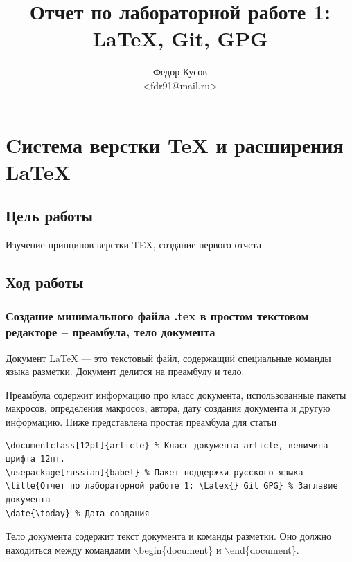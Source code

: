 \documentclass[12pt,a4paper]{article}
\author{Федор Кусов\\<fdr91@mail.ru>}
\title{Отчет по лабораторной работе 1: \\\LaTeX{}, Git, GPG}
\begin{document}
\maketitle
\newpage
\tableofcontents{}
\section{Cистема верстки \TeX{} и расширения \LaTeX{}}
\subsection{Цель работы}
Изучение принципов верстки TEX, создание первого отчета
\subsection{Ход работы}
\subsubsection{Создание минимального файла .tex в простом текстовом редакторе – преамбула, тело документа}


Документ LaTeX — это текстовый файл, содержащий специальные команды языка разметки. Документ делится на преамбулу и тело.

Преамбула содержит информацию про класс документа, использованные пакеты макросов, определения макросов, автора, дату создания документа и другую информацию. Ниже представлена простая преамбула для статьи
\begin{Verbatim}[xleftmargin=.5in,fontsize=\small]
\documentclass[12pt]{article} % Класс документа article, величина шрифта 12пт.
\usepackage[russian]{babel} % Пакет поддержки русского языка
\title{Отчет по лабораторной работе 1: \Latex{} Git GPG} % Заглавие документа
\date{\today} % Дата создания
\end{Verbatim}

Тело документа содержит текст документа и команды разметки. Оно должно находиться между командами $\backslash$begin\{document\} и $\backslash$end\{document\}.
\end{document}
